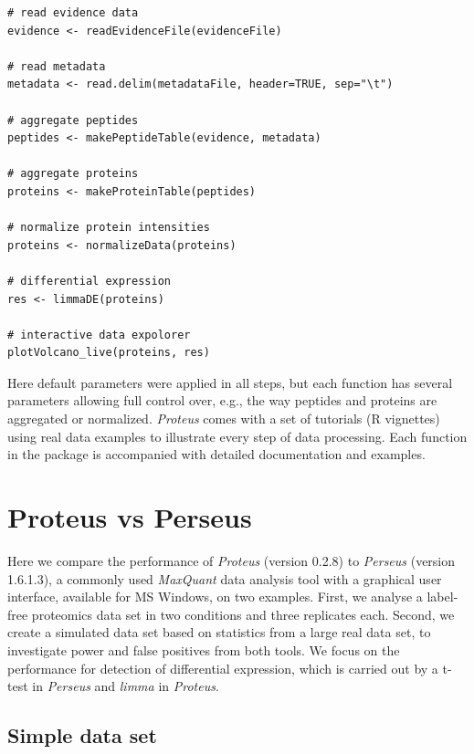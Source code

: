 \documentclass[]{article}
\begin{document}
\begin{verbatim}
# read evidence data
evidence <- readEvidenceFile(evidenceFile)

# read metadata
metadata <- read.delim(metadataFile, header=TRUE, sep="\t")

# aggregate peptides
peptides <- makePeptideTable(evidence, metadata)

# aggregate proteins
proteins <- makeProteinTable(peptides)

# normalize protein intensities
proteins <- normalizeData(proteins)

# differential expression
res <- limmaDE(proteins)

# interactive data expolorer
plotVolcano_live(proteins, res)
\end{verbatim}

Here default parameters were applied in all steps, but each function has
several parameters allowing full control over, e.g., the way peptides
and proteins are aggregated or normalized. \emph{Proteus} comes with a
set of tutorials (R vignettes) using real data examples to illustrate
every step of data processing. Each function in the package is
accompanied with detailed documentation and examples.

\section{Proteus vs Perseus}\label{proteus-vs-perseus}

Here we compare the performance of \emph{Proteus} (version 0.2.8) to
\emph{Perseus} (version 1.6.1.3), a commonly used \emph{MaxQuant} data
analysis tool with a graphical user interface, available for MS Windows,
on two examples. First, we analyse a label-free proteomics data set in
two conditions and three replicates each. Second, we create a simulated
data set based on statistics from a large real data set, to investigate
power and false positives from both tools. We focus on the performance
for detection of differential expression, which is carried out by a
t-test in \emph{Perseus} and \emph{limma} in \emph{Proteus}.

\subsection{Simple data set}\label{simple-data-set}
\end{document}
